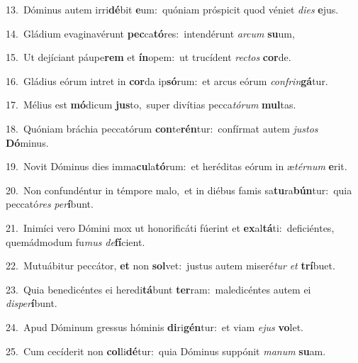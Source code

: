 {\numbfont\textcolor{\numbcolor}{13.}}~Dóminus autem irri\-\textbf{dé}\-bit \textbf{e}\-um:~\star quóniam próspicit quod véniet \textit{di}\-\textit{es} \textbf{e}\-jus.\par
{\numbfont\textcolor{\numbcolor}{14.}}~Gládium evaginavérunt \textbf{pec}\-ca\-\textbf{tó}\-res:~\star intendérunt \textit{ar}\-\textit{cum} \textbf{su}\-um,\par
{\numbfont\textcolor{\numbcolor}{15.}}~Ut dejíciant páupe\textbf{rem} et \textbf{ín}\-opem:~\star ut trucídent \textit{rec}\-\textit{tos} \textbf{cor}\-de.\par
{\numbfont\textcolor{\numbcolor}{16.}}~Gládius eórum intret in \textbf{cor}\-da ip\-\textbf{só}\-rum:~\star et arcus eórum \textit{con}\-\textit{frin}\textbf{gá}tur.\par
{\numbfont\textcolor{\numbcolor}{17.}}~Mélius est \textbf{mó}\-dicum \textbf{jus}\-to,~\star super divítias pecca\-\textit{tó}\-\textit{rum} \textbf{mul}\-tas.\par
{\numbfont\textcolor{\numbcolor}{18.}}~Quóniam bráchia peccatórum \textbf{con}\-te\-\textbf{rén}\-tur:~\star confírmat autem \textit{jus}\-\textit{tos} \textbf{Dó}\-minus.\par
{\numbfont\textcolor{\numbcolor}{19.}}~Novit Dóminus dies imma\-\textbf{cu}\-la\-\textbf{tó}\-rum:~\star et heréditas eórum in æ\-\textit{tér}\-\textit{num} \textbf{e}\-rit.\par
{\numbfont\textcolor{\numbcolor}{20.}}~Non confundéntur in témpore malo,~\dagger et in diébus famis sa\-\textbf{tu}\-ra\-\textbf{bún}\-tur:~\star quia peccató\textit{res} \textit{per}\-\textbf{í}bunt.\par
{\numbfont\textcolor{\numbcolor}{21.}}~Inimíci vero Dómini mox ut honorificáti fúerint et \textbf{ex}\-al\-\textbf{tá}\-ti:~\star deficiéntes, quemádmodum fu\textit{mus} \textit{de}\-\textbf{fí}cient.\par
{\numbfont\textcolor{\numbcolor}{22.}}~Mutuábitur peccátor, \textbf{et} non \textbf{sol}\-vet:~\star justus autem miseré\textit{tur} \textit{et} \textbf{trí}\-buet.\par
{\numbfont\textcolor{\numbcolor}{23.}}~Quia benedicéntes ei heredi\-\textbf{tá}\-bunt \textbf{ter}\-ram:~\star maledicéntes autem ei \textit{dis}\-\textit{per}\textbf{í}bunt.\par
{\numbfont\textcolor{\numbcolor}{24.}}~Apud Dóminum gressus hóminis \textbf{di}\-ri\-\textbf{gén}\-tur:~\star et viam \textit{e}\-\textit{jus} \textbf{vo}\-let.\par
{\numbfont\textcolor{\numbcolor}{25.}}~Cum cecíderit non \textbf{col}\-li\-\textbf{dé}\-tur:~\star quia Dóminus suppónit \textit{ma}\-\textit{num} \textbf{su}\-am.\par
